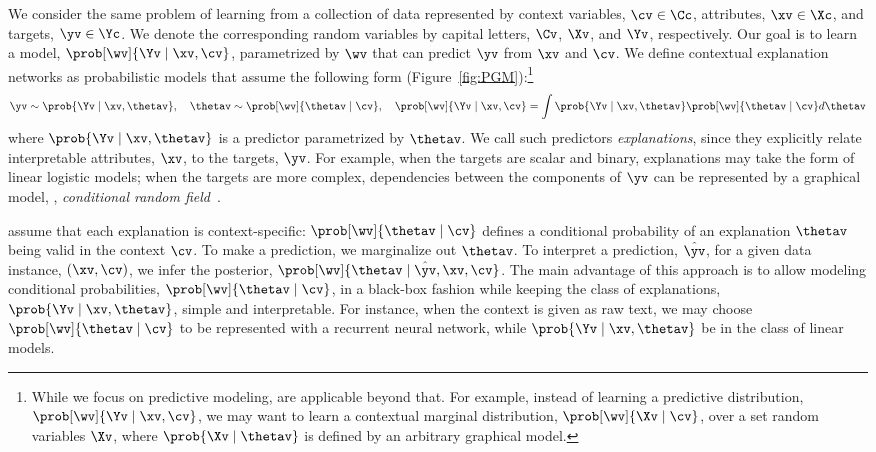 \documentclass[twoside,11pt]{article}
\begin{document}
We consider the same problem of learning from a collection of data represented by context variables, $\cv \in \Cc$, attributes, $\xv \in \Xc$, and targets, $\yv \in \Yc$.
We denote the corresponding random variables by capital letters, $\Cv$, $\Xv$, and $\Yv$, respectively.
Our goal is to learn a model, $\prob[\wv]{\Yv \mid \xv, \cv}$, parametrized by $\wv$ that can predict $\yv$ from $\xv$ and $\cv$.
We define contextual explanation networks as probabilistic models that assume the following form (Figure~\ref{fig:PGM}):\footnote{While we focus on predictive modeling, {\CENs} are applicable beyond that.
For example, instead of learning a predictive distribution, $\prob[\wv]{\Yv \mid \xv, \cv}$, we may want to learn a contextual marginal distribution, $\prob[\wv]{\Xv \mid \cv}$, over a set random variables $\Xv$, where $\prob{\Xv \mid \thetav}$ is defined by an arbitrary graphical model.}
\begin{equation}
    \label{eq:CEN-general}
    \yv \sim \prob{\Yv \mid \xv, \thetav}, \quad
    \thetav \sim \prob[\wv]{\thetav \mid \cv}, \quad
    \prob[\wv]{\Yv \mid \xv, \cv} = \int \prob{\Yv \mid \xv, \thetav} \prob[\wv]{\thetav \mid \cv} d\thetav
\end{equation}
where $\prob{\Yv \mid \xv, \thetav}$ is a predictor parametrized by $\thetav$.
We call such predictors \emph{explanations}, since they explicitly relate interpretable attributes, $\xv$, to the targets, $\yv$.
For example, when the targets are scalar and binary, explanations may take the form of linear logistic models;
when the targets are more complex, dependencies between the components of $\yv$ can be represented by a graphical model, \eg, \emph{conditional random field}~\citep{lafferty2001crf}.

{\CENs} assume that each explanation is context-specific: $\prob[\wv]{\thetav \mid \cv}$ defines a conditional probability of an explanation $\thetav$ being valid in the context $\cv$.
To make a prediction, we marginalize out $\thetav$.
To interpret a prediction, $\hat \yv$, for a given data instance, $(\xv, \cv)$, we infer the posterior, $\prob[\wv]{\thetav \mid \hat \yv, \xv, \cv}$.
The main advantage of this approach is to allow modeling conditional probabilities, $\prob[\wv]{\thetav \mid \cv}$, in a black-box fashion while keeping the class of explanations, $\prob{\Yv \mid \xv, \thetav}$, simple and interpretable.
For instance, when the context is given as raw text, we may choose $\prob[\wv]{\thetav \mid \cv}$ to be represented with a recurrent neural network, while $\prob{\Yv \mid \xv, \thetav}$ be in the class of linear models.
\end{document}
